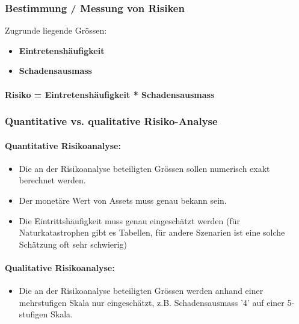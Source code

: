 \documentclass[10pt,a4paper]{article}
\begin{document}
\subsubsection*{Bestimmung / Messung von Risiken}

Zugrunde liegende Grössen:
\begin{itemize}[noitemsep,topsep=0pt,leftmargin=*]
    \item \textbf{Eintretenshäufigkeit}
    \item \textbf{Schadensausmass}
\end{itemize}

\paragraph*{Risiko = Eintretenshäufigkeit * Schadensausmass}

\subsubsection*{Quantitative vs. qualitative Risiko-Analyse}
\paragraph*{Quantitative Risikoanalyse:}
\begin{itemize}[noitemsep,topsep=0pt,leftmargin=*]
    \item Die an der Risikoanalyse beteiligten Grössen sollen numerisch exakt berechnet werden.
    \item Der monetäre Wert von Assets muss genau bekann sein.
    \item Die Eintrittshäufigkeit muss genau eingeschätzt werden (für Naturkatastrophen gibt es Tabellen, für andere Szenarien ist eine solche Schätzung oft sehr schwierig)
\end{itemize}

\paragraph*{Qualitative Risikoanalyse:}
\begin{itemize}[noitemsep,topsep=0pt,leftmargin=*]
    \item Die an der Risikoanalyse beteiligten Grössen werden anhand einer mehrstufigen Skala nur eingeschätzt, z.B. Schadensausmass '4' auf einer 5-stufigen Skala.
\end{itemize}
\end{document}
